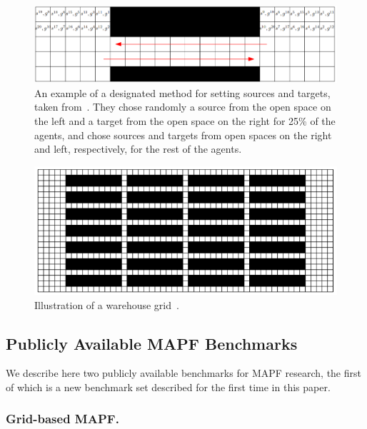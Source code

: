 \documentclass[letterpaper]{article} %
\newcommand{\mapf}{\ac{MAPF}\xspace}
\begin{document}
\begin{figure}[tb]
    \centering
    \includegraphics[width=\columnwidth]{designated.PNG}
    \caption{An example of a designated method for setting sources and targets, taken from~\cite{DBLP:conf/socs/CohenUK15}. They chose randomly a source from the open space on the left and a target from the open space on the right for 25\% of the agents, and chose sources and targets from open spaces on the right and left, respectively, for the rest of the agents.}
    \label{fig:designated}
\end{figure}

\begin{figure}[tb]
    \centering
    \includegraphics[width=\columnwidth]{warehouse.PNG}
    \caption{Illustration of a warehouse grid~\cite{CWKKCS:AAMAS:18}.}
    \label{fig:warehouse}
\end{figure}



\subsection{Publicly Available \mapf Benchmarks}

We describe here two publicly available benchmarks for \mapf research, the first of which is a new benchmark set described for the first time in this paper.

\subsubsection{Grid-based \mapf.}
\end{document}
